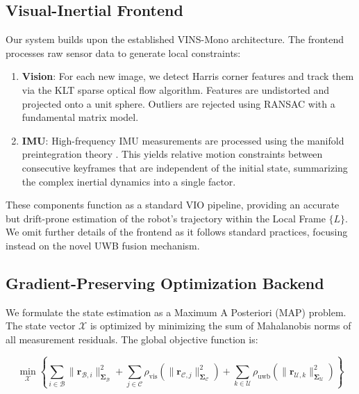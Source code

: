 \documentclass{svproc}
\begin{document}
\subsection{Visual-Inertial Frontend}

Our system builds upon the established VINS-Mono \cite{qn2018vins} architecture. The frontend processes raw sensor data to generate local constraints:

\begin{enumerate}
    \item \textbf{Vision}: For each new image, we detect Harris corner features and track them via the KLT sparse optical flow algorithm. Features are undistorted and projected onto a unit sphere. Outliers are rejected using RANSAC with a fundamental matrix model.
    \item \textbf{IMU}: High-frequency IMU measurements are processed using the manifold preintegration theory \cite{forster2016manifold}. This yields relative motion constraints between consecutive keyframes that are independent of the initial state, summarizing the complex inertial dynamics into a single factor.
\end{enumerate}

These components function as a standard VIO pipeline, providing an accurate but drift-prone estimation of the robot's trajectory within the Local Frame $\{L\}$. We omit further details of the frontend as it follows standard practices, focusing instead on the novel UWB fusion mechanism.

\subsection{Gradient-Preserving Optimization Backend}

We formulate the state estimation as a Maximum A Posteriori (MAP) problem. The state vector $\mathcal{X}$ is optimized by minimizing the sum of Mahalanobis norms of all measurement residuals. The global objective function is:

\begin{equation}
\min_{\mathcal{X}} \left\{ \sum_{i \in \mathcal{B}} \| \mathbf{r}_{\mathcal{B},i} \|^2_{\boldsymbol{\Sigma}_{\mathcal{B}}} + \sum_{j \in \mathcal{C}} \rho_{\text{vis}}( \| \mathbf{r}_{\mathcal{C},j} \|^2_{\boldsymbol{\Sigma}_{\mathcal{C}}} ) + \sum_{k \in \mathcal{U}} \rho_{\text{uwb}}( \| \mathbf{r}_{\mathcal{U},k} \|^2_{\boldsymbol{\Sigma}_{\mathcal{U}}} ) \right\}
\end{equation}
\end{document}
